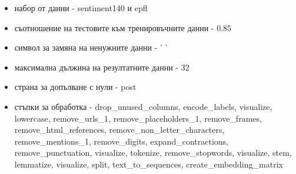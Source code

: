 \documentclass{article}
\begin{document}
\begin{itemize}
\begin{itemize}
\item набор от данни - sentiment140 и epfl
\item съотношение на тестовите към тренировъчните данни - 0.85
\item символ за замяна на ненужните данни - ' '
\item максимална дължина на резултатните данни - 32
\item страна за допълване с нули - post
\item стъпки за обработка - drop\_unused\_columns, encode\_labels, visualize, lowercase, remove\_urls\_1,
remove\_placeholders\_1, remove\_frames, remove\_html\_references, remove\_non\_letter\_characters,
remove\_mentions\_1, remove\_digits, expand\_contractions, remove\_punctuation, visualize, tokenize,
remove\_stopwords, visualize, stem, lemmatize, visualize, split, text\_to\_sequences, create\_embedding\_matrix
\end{itemize}


\end{itemize}
\end{document}

